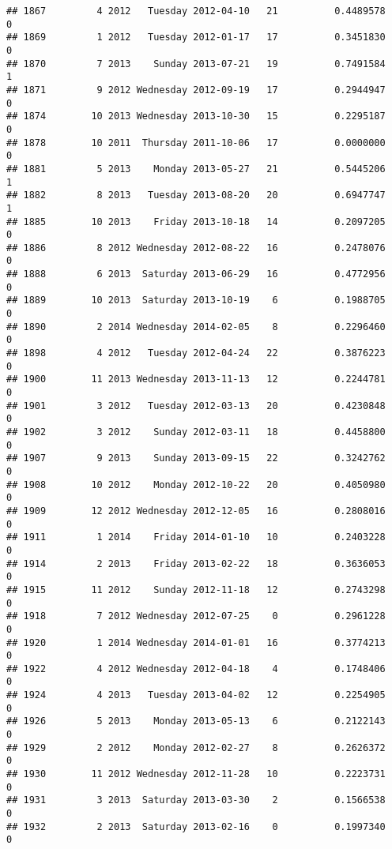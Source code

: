 \documentclass[
]{article}
\begin{document}
\begin{verbatim}
## 1867         4 2012   Tuesday 2012-04-10   21          0.4489578             0
## 1869         1 2012   Tuesday 2012-01-17   17          0.3451830             0
## 1870         7 2013    Sunday 2013-07-21   19          0.7491584             1
## 1871         9 2012 Wednesday 2012-09-19   17          0.2944947             0
## 1874        10 2013 Wednesday 2013-10-30   15          0.2295187             0
## 1878        10 2011  Thursday 2011-10-06   17          0.0000000             0
## 1881         5 2013    Monday 2013-05-27   21          0.5445206             1
## 1882         8 2013   Tuesday 2013-08-20   20          0.6947747             1
## 1885        10 2013    Friday 2013-10-18   14          0.2097205             0
## 1886         8 2012 Wednesday 2012-08-22   16          0.2478076             0
## 1888         6 2013  Saturday 2013-06-29   16          0.4772956             0
## 1889        10 2013  Saturday 2013-10-19    6          0.1988705             0
## 1890         2 2014 Wednesday 2014-02-05    8          0.2296460             0
## 1898         4 2012   Tuesday 2012-04-24   22          0.3876223             0
## 1900        11 2013 Wednesday 2013-11-13   12          0.2244781             0
## 1901         3 2012   Tuesday 2012-03-13   20          0.4230848             0
## 1902         3 2012    Sunday 2012-03-11   18          0.4458800             0
## 1907         9 2013    Sunday 2013-09-15   22          0.3242762             0
## 1908        10 2012    Monday 2012-10-22   20          0.4050980             0
## 1909        12 2012 Wednesday 2012-12-05   16          0.2808016             0
## 1911         1 2014    Friday 2014-01-10   10          0.2403228             0
## 1914         2 2013    Friday 2013-02-22   18          0.3636053             0
## 1915        11 2012    Sunday 2012-11-18   12          0.2743298             0
## 1918         7 2012 Wednesday 2012-07-25    0          0.2961228             0
## 1920         1 2014 Wednesday 2014-01-01   16          0.3774213             0
## 1922         4 2012 Wednesday 2012-04-18    4          0.1748406             0
## 1924         4 2013   Tuesday 2013-04-02   12          0.2254905             0
## 1926         5 2013    Monday 2013-05-13    6          0.2122143             0
## 1929         2 2012    Monday 2012-02-27    8          0.2626372             0
## 1930        11 2012 Wednesday 2012-11-28   10          0.2223731             0
## 1931         3 2013  Saturday 2013-03-30    2          0.1566538             0
## 1932         2 2013  Saturday 2013-02-16    0          0.1997340             0

\end{verbatim}
\end{document}
